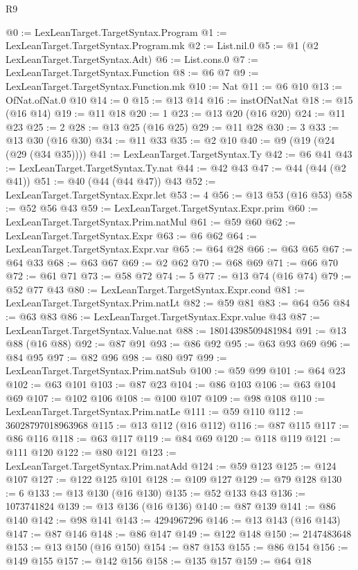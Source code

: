 \begin{lexlean}{R9}
\begin{coremodule}
@0 := LexLeanTarget.TargetSyntax.Program
@1 := LexLeanTarget.TargetSyntax.Program.mk
@2 := List.nil.{0}
@5 := @1 (@2 LexLeanTarget.TargetSyntax.Adt)
@6 := List.cons.{0}
@7 := LexLeanTarget.TargetSyntax.Function
@8 := @6 @7
@9 := LexLeanTarget.TargetSyntax.Function.mk
@10 := Nat
@11 := @6 @10
@13 := OfNat.ofNat.{0} @10
@14 := 0
@15 := @13 @14
@16 := instOfNatNat
@18 := @15 (@16 @14)
@19 := @11 @18
@20 := 1
@23 := @13 @20 (@16 @20)
@24 := @11 @23
@25 := 2
@28 := @13 @25 (@16 @25)
@29 := @11 @28
@30 := 3
@33 := @13 @30 (@16 @30)
@34 := @11 @33
@35 := @2 @10
@40 := @9 (@19 (@24 (@29 (@34 @35))))
@41 := LexLeanTarget.TargetSyntax.Ty
@42 := @6 @41
@43 := LexLeanTarget.TargetSyntax.Ty.nat
@44 := @42 @43
@47 := @44 (@44 (@2 @41))
@51 := @40 (@44 (@44 @47)) @43
@52 := LexLeanTarget.TargetSyntax.Expr.let
@53 := 4
@56 := @13 @53 (@16 @53)
@58 := @52 @56 @43
@59 := LexLeanTarget.TargetSyntax.Expr.prim
@60 := LexLeanTarget.TargetSyntax.Prim.natMul
@61 := @59 @60
@62 := LexLeanTarget.TargetSyntax.Expr
@63 := @6 @62
@64 := LexLeanTarget.TargetSyntax.Expr.var
@65 := @64 @28
@66 := @63 @65
@67 := @64 @33
@68 := @63 @67
@69 := @2 @62
@70 := @68 @69
@71 := @66 @70
@72 := @61 @71
@73 := @58 @72
@74 := 5
@77 := @13 @74 (@16 @74)
@79 := @52 @77 @43
@80 := LexLeanTarget.TargetSyntax.Expr.cond
@81 := LexLeanTarget.TargetSyntax.Prim.natLt
@82 := @59 @81
@83 := @64 @56
@84 := @63 @83
@86 := LexLeanTarget.TargetSyntax.Expr.value @43
@87 := LexLeanTarget.TargetSyntax.Value.nat
@88 := 18014398509481984
@91 := @13 @88 (@16 @88)
@92 := @87 @91
@93 := @86 @92
@95 := @63 @93 @69
@96 := @84 @95
@97 := @82 @96
@98 := @80 @97
@99 := LexLeanTarget.TargetSyntax.Prim.natSub
@100 := @59 @99
@101 := @64 @23
@102 := @63 @101
@103 := @87 @23
@104 := @86 @103
@106 := @63 @104 @69
@107 := @102 @106
@108 := @100 @107
@109 := @98 @108
@110 := LexLeanTarget.TargetSyntax.Prim.natLe
@111 := @59 @110
@112 := 36028797018963968
@115 := @13 @112 (@16 @112)
@116 := @87 @115
@117 := @86 @116
@118 := @63 @117
@119 := @84 @69
@120 := @118 @119
@121 := @111 @120
@122 := @80 @121
@123 := LexLeanTarget.TargetSyntax.Prim.natAdd
@124 := @59 @123
@125 := @124 @107
@127 := @122 @125 @101
@128 := @109 @127
@129 := @79 @128
@130 := 6
@133 := @13 @130 (@16 @130)
@135 := @52 @133 @43
@136 := 1073741824
@139 := @13 @136 (@16 @136)
@140 := @87 @139
@141 := @86 @140
@142 := @98 @141
@143 := 4294967296
@146 := @13 @143 (@16 @143)
@147 := @87 @146
@148 := @86 @147
@149 := @122 @148
@150 := 2147483648
@153 := @13 @150 (@16 @150)
@154 := @87 @153
@155 := @86 @154
@156 := @149 @155
@157 := @142 @156
@158 := @135 @157
@159 := @64 @18

\end{coremodule}
\end{lexlean}
